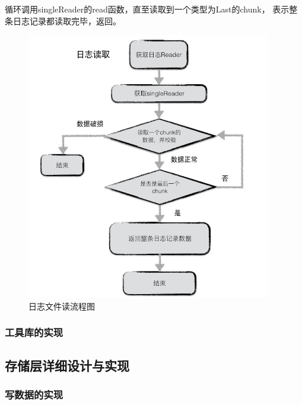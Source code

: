 \begin{enumerate}
		循环调用singleReader的read函数，直至读取到一个类型为Last的chunk，
		表示整条日志记录都读取完毕，返回。

		\begin{figure}[H]
			\centering
			\includegraphics[width=0.95\textwidth]{images/journal_read}
			\caption{日志文件读流程图}
			\label{journal_read}
		\end{figure}
		
		
	
	\end{enumerate}
	
   	\subsubsection{工具库的实现}
    


  	\subsection{存储层详细设计与实现}
	
	\subsubsection{写数据的实现}
		
